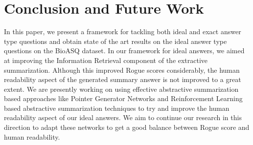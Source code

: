 \documentclass[11pt,a4paper]{article}
\begin{document}

\section{Conclusion and Future Work}
\label{future}
In this paper, we present a framework for tackling both ideal and exact answer type questions and obtain state of the art results on the ideal answer type questions on the BioASQ dataset. In our framework for ideal answers, we aimed at improving the Information Retrieval component of the extractive summarization. Although this improved Rogue scores considerably, the human readability aspect of the generated summary answer is not improved to a great extent. We are presently working on using effective abstractive summarization based approaches like Pointer Generator Networks \cite{PGC} and Reinforcement Learning based abstractive summarization techniques \cite{salesforce} to try and improve the human readability aspect of our ideal answers. We aim to continue our research in this direction to adapt these networks to get a good balance between Rogue score and human readability.



%
%



\appendix
\end{document}
